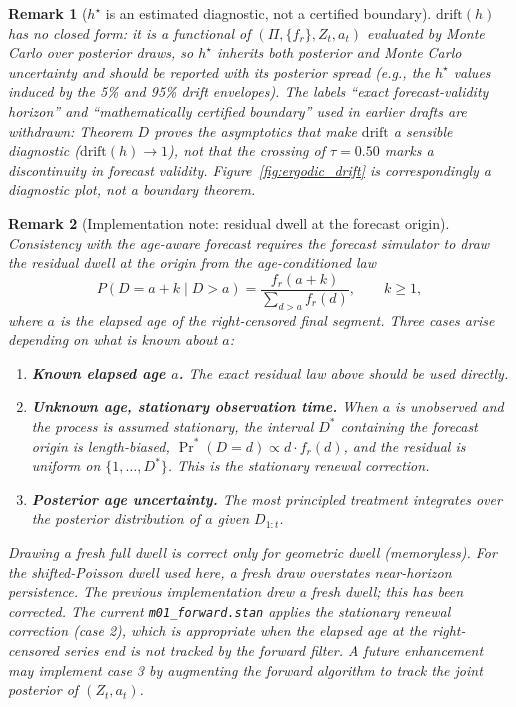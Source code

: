 \documentclass[11pt,a4paper]{article}
\newtheorem{remark}{Remark}
\begin{document}
\begin{remark}[$h^\star$ is an estimated diagnostic, not a certified boundary]
$\text{drift}(h)$ has no closed form: it is a functional of $(\Pi, \{f_r\}, Z_t, a_t)$ evaluated by Monte Carlo over posterior draws, so $h^\star$ inherits both posterior and Monte Carlo uncertainty and should be reported with its posterior spread (e.g., the $h^\star$ values induced by the 5\% and 95\% drift envelopes). The labels ``exact forecast-validity horizon'' and ``mathematically certified boundary'' used in earlier drafts are withdrawn: Theorem $D$ proves the asymptotics that make $\text{drift}$ a sensible diagnostic ($\text{drift}(h) \to 1$), not that the crossing of $\tau = 0.50$ marks a discontinuity in forecast validity. Figure~\ref{fig:ergodic_drift} is correspondingly a diagnostic plot, not a boundary theorem. %
\end{remark}

\begin{remark}[Implementation note: residual dwell at the forecast origin]
Consistency with the age-aware forecast requires the forecast simulator to draw the \emph{residual} dwell at the origin from the age-conditioned law
\[
P(D = a + k \mid D > a) = \frac{f_r(a + k)}{\sum_{d > a} f_r(d)}, \qquad k \ge 1, %
\]
where $a$ is the elapsed age of the right-censored final segment. Three cases arise depending on what is known about $a$: %
\begin{enumerate}
    \item \textbf{Known elapsed age $a$.} The exact residual law above should be used directly.
    \item \textbf{Unknown age, stationary observation time.} When $a$ is unobserved and the process is assumed stationary, the interval $D^*$ containing the forecast origin is length-biased, $\Pr^*(D = d) \propto d \cdot f_r(d)$, and the residual is uniform on $\{1, \dots, D^*\}$. This is the \emph{stationary renewal correction}.
    \item \textbf{Posterior age uncertainty.} The most principled treatment integrates over the posterior distribution of $a$ given $D_{1:t}$.
\end{enumerate}
Drawing a fresh full dwell is correct only for geometric dwell (memoryless). For the shifted-Poisson dwell used here, a fresh draw overstates near-horizon persistence. The previous implementation drew a fresh dwell; this has been corrected. The current \texttt{m01\_forward.stan} applies the stationary renewal correction (case 2), which is appropriate when the elapsed age at the right-censored series end is not tracked by the forward filter. A future enhancement may implement case 3 by augmenting the forward algorithm to track the joint posterior of $(Z_t, a_t)$. %
\end{remark}
\end{document}
